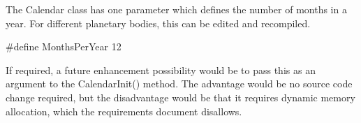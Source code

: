 
The Calendar class has one parameter which defines the number of months
in a year.  For different planetary bodies, this can be edited and
recompiled.

        \#define MonthsPerYear 12

If required, a future enhancement possibility would be to pass this as an
argument to the CalendarInit() method.  The advantage would be no source
code change required, but the disadvantage would be that it requires
dynamic memory allocation, which the requirements document disallows.
